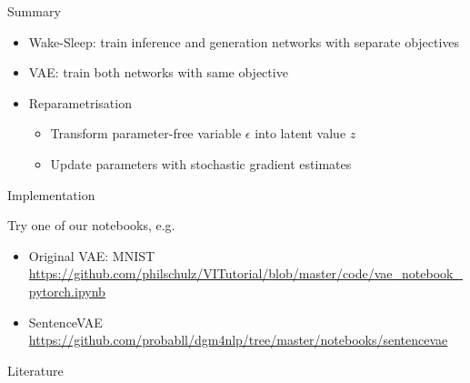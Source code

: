 \documentclass[14pt]{beamer}
\begin{document}
\begin{frame}{Summary}
\begin{itemize}
\item Wake-Sleep: train inference and generation networks with separate objectives
\item VAE: train both networks with same objective
\item Reparametrisation
\begin{itemize}
\item  Transform parameter-free variable $ \epsilon $ into latent value $ z $
\item Update parameters with stochastic gradient estimates
\end{itemize}
\end{itemize}
\end{frame}

\begin{frame}{Implementation}

Try one of our notebooks, e.g.
\begin{itemize}
	\item Original VAE: MNIST\\
	\url{https://github.com/philschulz/VITutorial/blob/master/code/vae_notebook_pytorch.ipynb}
	\item SentenceVAE\\
	\url{https://github.com/probabll/dgm4nlp/tree/master/notebooks/sentencevae}
\end{itemize}
\end{frame}

\begin{frame}[allowframebreaks]{Literature}
\nocite{KingmaWelling:2013}
\nocite{HintonEtAl:1995}
\nocite{RezendeEtAl:2014}
\nocite{TitsiasLazarogredilla:2014}
\nocite{KucukelbirEtAl:2017}



\end{frame}
\end{document}
